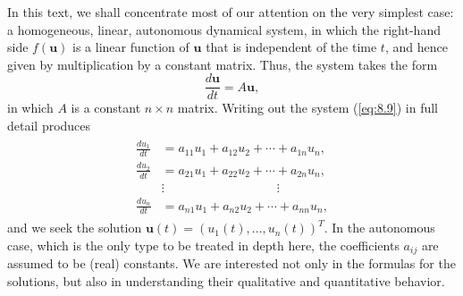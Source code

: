 \documentclass[12pt]{article}
\theoremstyle{remark}
\begin{document}
In this text, we shall concentrate most of our attention on the very simplest case: a homogeneous, linear, autonomous dynamical system, in which the right-hand side $f(\mathbf{u})$ is a linear function of $\mathbf{u}$ that is independent of the time $t$, and hence given by multiplication by a constant matrix. Thus, the system takes the form
\begin{equation}
    \frac{d\mathbf{u}}{dt} = A\mathbf{u},
    \label{eq:8.9}
\end{equation}
in which $A$ is a constant $n\times n$ matrix. Writing out the system (\ref{eq:8.9}) in full detail produces
\begin{align}
    \begin{split}
    \frac{du_1}{dt} &= a_{11}u_1 + a_{12}u_2 + \cdots + a_{1n}u_n,\\
    \frac{du_2}{dt} &= a_{21}u_1 + a_{22}u_2 + \cdots + a_{2n}u_n,\\
                    &\vdots \qquad \qquad \qquad \quad \qquad \vdots \\
    \frac{du_n}{dt} &= a_{n1}u_1 + a_{n2}u_2 + \cdots + a_{nn}u_n,
    \label{eq:8.10}
    \end{split}
\end{align}
and we seek the solution $\mathbf{u}(t)=\left(u_1(t),\ldots,u_n(t)\right)^T$. In the autonomous case, which is the only type to be treated in depth here, the coefficients $a_{ij}$ are assumed to be (real) constants. We are interested not only in the formulas for the solutions, but also in understanding their qualitative and quantitative behavior.
\end{document}

